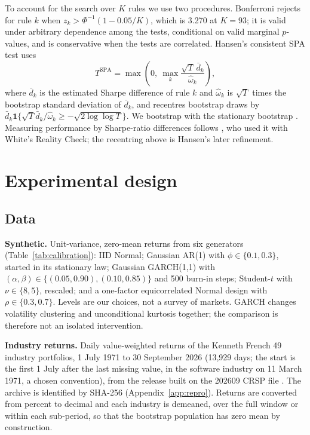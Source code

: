 \documentclass[11pt,a4paper]{article}
\theoremstyle{remark}
\begin{document}
To account for the search over $K$ rules we use two procedures. Bonferroni rejects for rule $k$ when $z_k>\Phi^{-1}(1-0.05/K)$, which is 3.270 at $K=93$; it is valid under arbitrary dependence among the tests, conditional on valid marginal $p$-values, and is conservative when the tests are correlated. Hansen's consistent SPA test \citep{hansen2005} uses
\begin{equation}\label{eq:spa}
T^{\mathrm{SPA}}=\max\!\left(0,\ \max_{k}\frac{\sqrt T\,\bar d_k}{\hat\omega_k}\right),
\end{equation}
where $\bar d_k$ is the estimated Sharpe difference of rule $k$ and $\hat\omega_k$ is $\sqrt T$ times the bootstrap standard deviation of $\bar d_k$, and recentres bootstrap draws by $\bar d_k\mathbf 1\{\sqrt T\bar d_k/\hat\omega_k\ge-\sqrt{2\log\log T}\}$. We bootstrap with the stationary bootstrap \citep{politis1994}. Measuring performance by Sharpe-ratio differences follows \citet{sullivan1999}, who used it with White's Reality Check; the recentring above is Hansen's later refinement.

\section{Experimental design}\label{sec:design}

\subsection{Data}
\textbf{Synthetic.} Unit-variance, zero-mean returns from six generators (Table~\ref{tab:calibration}): IID Normal; Gaussian AR(1) with $\phi\in\{0.1,0.3\}$, started in its stationary law; Gaussian GARCH(1,1) with $(\alpha,\beta)\in\{(0.05,0.90),(0.10,0.85)\}$ and 500 burn-in steps; Student-$t$ with $\nu\in\{8,5\}$, rescaled; and a one-factor equicorrelated Normal design with $\rho\in\{0.3,0.7\}$. Levels are our choices, not a survey of markets. GARCH changes volatility clustering and unconditional kurtosis together; the comparison is therefore not an isolated intervention.

\textbf{Industry returns.} Daily value-weighted returns of the Kenneth French 49 industry portfolios, 1 July 1971 to 30 September 2026 (13,929 days; the start is the first 1 July after the last missing value, in the software industry on 11 March 1971, a chosen convention), from the release built on the 202609 CRSP file \citep{french2026data}. The archive is identified by SHA-256 (Appendix~\ref{app:repro}). Returns are converted from percent to decimal and each industry is demeaned, over the full window or within each sub-period, so that the bootstrap population has zero mean by construction.
\end{document}
